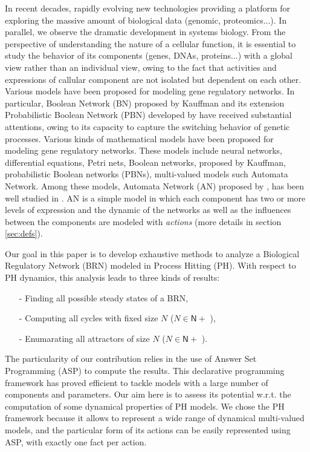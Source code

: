 
In recent decades, rapidly evolving new technologies providing a platform for exploring the massive amount of biological data (genomic, proteomics...). In parallel, we observe the dramatic development in systems biology. From the perspective of understanding the nature of a cellular function, it is essential to study the behavior of its components (genes, DNAs, proteins...) with a global view rather than an individual view, owing to the fact that activities and expressions of callular component are not isolated but dependent on each other. Various models have been proposed for modeling gene regulatory networks. In particular, Boolean Network (BN) proposed by Kauffman  and its extension Probabilistic Boolean Network (PBN) developed by have received substantial attentions, owing to its capacity to capture the switching behavior of genetic processes. 
Various kinds of mathematical models have been proposed for modeling gene regulatory networks. These models include neural networks, differential equations, Petri nets, Boolean networks, proposed by Kauffman, probabilistic Boolean networks (PBNs), multi-valued models such Automata Network. Among these models, Automata Network (AN) proposed by , has been well studied in . AN is a simple model in which each component has two or more levels of expression and the dynamic of the networks as well as the influences between the components are modeled with \emph{actions} (more details in section \ref{sec:defs}).

Our goal in this paper is to develop exhaustive methods to analyze a Biological Regulatory Network (BRN) modeled in Process Hitting (PH). With respect to PH dynamics, this analysis leads to three kinds of results:
\begin{itemize}
\item[-] Finding all possible steady states of a BRN,
\item[-] Computing all cycles with fixed size $N$ ($N \in \mathsf{N}+$ ),
\item[-] Enumarating all attractors of size $N$ ($N \in \mathsf{N}+$ ).
\end{itemize}
 The particularity of our contribution relies in the use of Answer Set Programming
(ASP) \cite{baral2003knowledge}
to compute the results.
This declarative programming framework has proved efficient
to tackle models with a large number of components and parameters.
Our aim here is to assess its potential w.r.t. the computation
of some dynamical properties of PH models.
We chose the PH framework because it allows to represent a wide range of dynamical multi-valued models, and the particular form of its actions
can be easily represented using ASP,
with exactly one fact per action.